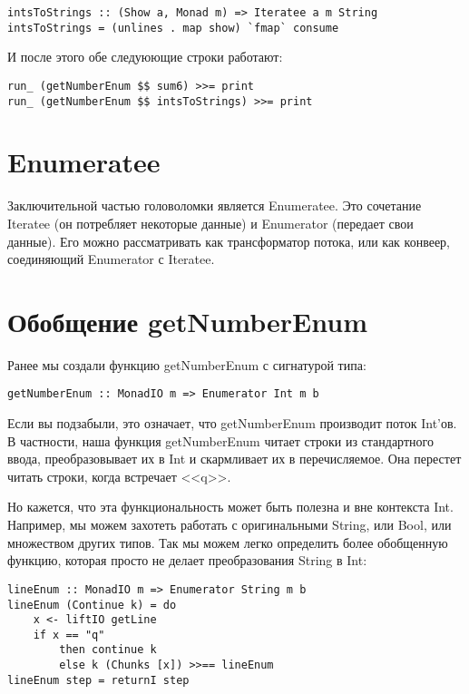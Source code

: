 \begin{lstlisting}
intsToStrings :: (Show a, Monad m) => Iteratee a m String
intsToStrings = (unlines . map show) `fmap` consume
\end{lstlisting}

И после этого обе следуюющие строки работают:

\begin{lstlisting}
run_ (getNumberEnum $$ sum6) >>= print
run_ (getNumberEnum $$ intsToStrings) >>= print
\end{lstlisting}%

\section{Enumeratee}

Заключительной частью головоломки является Enumeratee. Это сочетание Iteratee (он потребляет некоторые данные) и Enumerator (передает свои данные). Его можно рассматривать как трансформатор потока, или как конвеер, соединяющий Enumerator с Iteratee.

\section{Обобщение getNumberEnum}

Ранее мы создали функцию getNumberEnum с сигнатурой типа:

\begin{lstlisting}
getNumberEnum :: MonadIO m => Enumerator Int m b
\end{lstlisting}

Если вы подзабыли, это означает, что getNumberEnum производит поток Int'ов. В частности, наша функция getNumberEnum читает строки из стандартного ввода, преобразовывает их в Int и скармливает их в перечисляемое. Она перестет читать строки, когда встречает <<q>>. 

Но кажется, что эта функциональность может быть полезна и вне контекста Int. Например, мы можем захотеть работать с оригинальными String, или Bool, или множеством других типов. Так мы можем легко определить более обобщенную функцию, которая просто не делает преобразования String в Int:

\begin{lstlisting}
lineEnum :: MonadIO m => Enumerator String m b
lineEnum (Continue k) = do
    x <- liftIO getLine
    if x == "q"
        then continue k
        else k (Chunks [x]) >>== lineEnum
lineEnum step = returnI step
\end{lstlisting}

